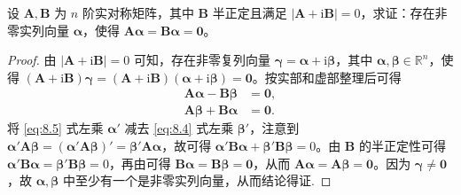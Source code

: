 \documentclass[../../main.tex]{subfiles}
\begin{document}
\begin{proposition}\label{proposition:命题8.5735161}
设 $\boldsymbol{A},\boldsymbol{B}$ 为 $n$ 阶实对称矩阵，其中 $\boldsymbol{B}$ 半正定且满足 $|\boldsymbol{A}+\mathrm{i}\boldsymbol{B}| = 0$，求证：存在非零实列向量 $\boldsymbol{\alpha}$，使得 $\boldsymbol{A}\boldsymbol{\alpha}=\boldsymbol{B}\boldsymbol{\alpha}=\boldsymbol{0}$。
\end{proposition}
\begin{proof}
由 $|\boldsymbol{A}+\mathrm{i}\boldsymbol{B}| = 0$ 可知，存在非零复列向量 $\boldsymbol{\gamma}=\boldsymbol{\alpha}+\mathrm{i}\boldsymbol{\beta}$，其中 $\boldsymbol{\alpha},\boldsymbol{\beta}\in\mathbb{R}^n$，使得 $(\boldsymbol{A}+\mathrm{i}\boldsymbol{B})\boldsymbol{\gamma}=(\boldsymbol{A}+\mathrm{i}\boldsymbol{B})(\boldsymbol{\alpha}+\mathrm{i}\boldsymbol{\beta})=\boldsymbol{0}$。按实部和虚部整理后可得
\begin{align}
\boldsymbol{A}\boldsymbol{\alpha}-\boldsymbol{B}\boldsymbol{\beta}&=\boldsymbol{0}, \label{eq:8.4}\\
\boldsymbol{A}\boldsymbol{\beta}+\boldsymbol{B}\boldsymbol{\alpha}&=\boldsymbol{0}. \label{eq:8.5}
\end{align}
将 \eqref{eq:8.5} 式左乘 $\boldsymbol{\alpha}'$ 减去 \eqref{eq:8.4} 式左乘 $\boldsymbol{\beta}'$，注意到 $\boldsymbol{\alpha}'\boldsymbol{A}\boldsymbol{\beta}=(\boldsymbol{\alpha}'\boldsymbol{A}\boldsymbol{\beta})'=\boldsymbol{\beta}'\boldsymbol{A}\boldsymbol{\alpha}$，故可得 $\boldsymbol{\alpha}'\boldsymbol{B}\boldsymbol{\alpha}+\boldsymbol{\beta}'\boldsymbol{B}\boldsymbol{\beta}=0$。由 $\boldsymbol{B}$ 的半正定性可得 $\boldsymbol{\alpha}'\boldsymbol{B}\boldsymbol{\alpha}=\boldsymbol{\beta}'\boldsymbol{B}\boldsymbol{\beta}=0$，再由可得 $\boldsymbol{B}\boldsymbol{\alpha}=\boldsymbol{B}\boldsymbol{\beta}=\boldsymbol{0}$，从而 $\boldsymbol{A}\boldsymbol{\alpha}=\boldsymbol{A}\boldsymbol{\beta}=\boldsymbol{0}$。因为 $\boldsymbol{\gamma}\neq\boldsymbol{0}$，故 $\boldsymbol{\alpha},\boldsymbol{\beta}$ 中至少有一个是非零实列向量，从而结论得证.
\end{proof}
\end{document}
